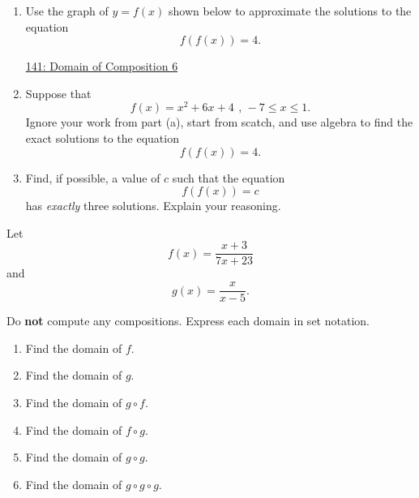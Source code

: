\documentclass{ximera}
\begin{document}
\begin{question} \label{Q324df43ggr}
\begin{enumerate}
\item Use the graph of $y=f(x)$ shown below to approximate the solutions to the equation
\[
    f(f(x)) = 4 .
\]

\begin{onlineOnly}
    \begin{center}
\end{center}
\end{onlineOnly}

\href{https://www.desmos.com/calculator/hbegdhlhbb}{141: Domain of Composition 6}

\item Suppose that 
\[
       f(x) = x^{2}+6x+4\  \, , \, -7\leq x\leq 1  .
\]
Ignore your work from part (a), start from scatch, and use algebra to find the exact solutions to the equation 
\[
    f(f(x)) = 4.
\]

\item Find, if possible, a value of $c$ such that the equation
\[
    f(f(x))=c
\]
has \emph{exactly} three solutions. Explain your reasoning.

\end{enumerate}

\end{question}


\begin{example} \label{Ex1:Com334p}
Let 
\[
     f(x) = \frac{x+3}{7x+23}
\]
and
\[
    g(x) = \frac{x}{x-5} .
\]

Do {\bf not} compute any compositions. Express each domain in set notation.

\begin{enumerate}
 
\item Find the domain of $f$.

\item Find the domain of $g$.

\item Find the domain of $g\circ f$.

\item Find the domain of $f\circ g$.

\item Find the domain of $g\circ g$.

\item Find the domain of $g\circ g\circ g$.

\end{enumerate}

\end{example}
\end{document}
